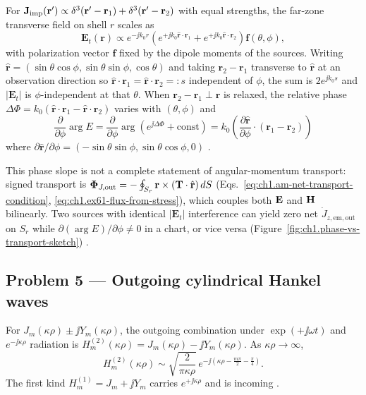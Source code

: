 For $\mathbf{J}_{\mathrm{imp}}(\mathbf{r}')\propto\delta^3(\mathbf{r}'-\mathbf{r}_1)+\delta^3(\mathbf{r}'-\mathbf{r}_2)$ with equal strengths, the far-zone transverse field on shell $r$ scales as
\[
\mathbf{E}_t(\mathbf{r})\propto e^{-\jj k_0 r}\left(e^{+\jj k_0\hat{\mathbf{r}}\cdot\mathbf{r}_1}+e^{+\jj k_0\hat{\mathbf{r}}\cdot\mathbf{r}_2}\right)\mathbf{f}(\theta,\phi),
\]
with polarization vector $\mathbf{f}$ fixed by the dipole moments of the sources. Writing $\hat{\mathbf{r}}=(\sin\theta\cos\phi,\sin\theta\sin\phi,\cos\theta)$ and taking $\mathbf{r}_2-\mathbf{r}_1$ transverse to $\hat{\mathbf{r}}$ at an observation direction so $\hat{\mathbf{r}}\cdot\mathbf{r}_1=\hat{\mathbf{r}}\cdot\mathbf{r}_2=:s$ independent of $\phi$, the sum is $2e^{\jj k_0 s}$ and $|\mathbf{E}_t|$ is $\phi$-independent at that $\theta$. When $\mathbf{r}_2-\mathbf{r}_1\perp\hat{\mathbf{r}}$ is relaxed, the relative phase $\Delta\Phi=k_0(\hat{\mathbf{r}}\cdot\mathbf{r}_1-\hat{\mathbf{r}}\cdot\mathbf{r}_2)$ varies with $(\theta,\phi)$ and
\[
\frac{\partial}{\partial\phi}\arg E=\frac{\partial}{\partial\phi}\arg\!\left(e^{\jj\Delta\Phi}+\text{const}\right)
=k_0\left(\frac{\partial\hat{\mathbf{r}}}{\partial\phi}\cdot(\mathbf{r}_1-\mathbf{r}_2)\right)
\]
where $\partial\hat{\mathbf{r}}/\partial\phi=(-\sin\theta\sin\phi,\sin\theta\cos\phi,0)$ \cite{stratton1941}.

This phase slope is not a complete statement of angular-momentum transport: signed transport is $\boldsymbol{\Phi}_{J,\mathrm{out}}=-\oint_{S_r}\mathbf{r}\times(\mathbf{T}\cdot\hat{\mathbf{r}})\,dS$ (Eqs.~\eqref{eq:ch1.am-net-transport-condition}, \eqref{eq:ch1.ex61-flux-from-stress}), which couples both $\mathbf{E}$ and $\mathbf{H}$ bilinearly. Two sources with identical $|\mathbf{E}_t|$ interference can yield zero net $\dot J_{z,\mathrm{em,out}}$ on $S_r$ while $\partial(\arg E)/\partial\phi\neq0$ in a chart, or vice versa (Figure~\ref{fig:ch1.phase-vs-transport-sketch}) \cite{beth1936,stratton1941}.

\subsection*{Problem 5 --- Outgoing cylindrical Hankel waves}

For $J_m(\kappa\rho)\pm\jj Y_m(\kappa\rho)$, the outgoing combination under $\exp(+\jj\omega t)$ and $e^{-\jj\kappa\rho}$ radiation is $H_m^{(2)}(\kappa\rho)=J_m(\kappa\rho)-\jj Y_m(\kappa\rho)$. As $\kappa\rho\to\infty$,
\begin{equation}
H_m^{(2)}(\kappa\rho)\sim\sqrt{\frac{2}{\pi\kappa\rho}}\,
e^{-\jj\left(\kappa\rho-\frac{m\pi}{2}-\frac{\pi}{4}\right)}.
\end{equation}
The first kind $H_m^{(1)}=J_m+\jj Y_m$ carries $e^{+\jj\kappa\rho}$ and is incoming \cite{stratton1941,harrington2001}.

